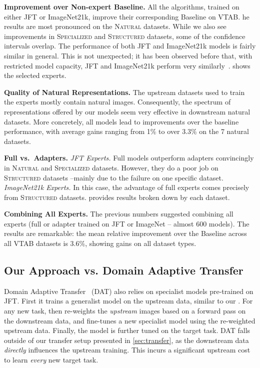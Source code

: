 \documentclass{article}
\newcommand{\JFT}{{JFT}\xspace}
\begin{document}
\textbf{Improvement over Non-expert Baseline.}
All the algorithms, trained on either \JFT or ImageNet21k, improve their corresponding Baseline on VTAB.
he results are most pronounced on the \textsc{Natural} datasets.
While we also see improvements in \textsc{Specialized} and \textsc{Structured} datasets, some of the confidence intervals overlap.
The performance of both \JFT and ImageNet21k models is fairly similar in general.
This is not unexpected; it has been observed before that, with restricted model capacity, \JFT and ImageNet21k perform very similarly~\cite{kolesnikov2019large}.
 shows the selected experts.

\textbf{Quality of Natural Representations.}
The upstream datasets used to train the experts mostly contain natural images.
Consequently, the spectrum of representations offered by our models seem very effective in downstream natural datasets.
More concretely, all models lead to improvements over the baseline performance, with average gains ranging from 1\% to over 3.3\% on the 7 natural datasets.

\textbf{Full vs.\ Adapters.}
\emph{JFT Experts.}
Full models outperform adapters convincingly in \textsc{Natural} and \textsc{Specialized} datasets.
However, they do a poor job on \textsc{Structured} datasets --mainly due to the failure on one specific dataset.
 \emph{ImageNet21k Experts.}
In this case, the advantage of full experts comes precisely from \textsc{Structured} datasets.
 provides results broken down by each dataset.

\textbf{Combining All Experts.} The previous numbers suggested combining all experts (full or adapter trained on JFT or ImageNet -- almost 600 models). The results are remarkable: the mean relative improvement over the Baseline across all 
VTAB datasets is 3.6\%, showing gains on all dataset types.
    






    
    



\subsection{Our Approach vs. Domain Adaptive Transfer}
\label{subsec:adaptive_transfer_comparison}

Domain Adaptive Transfer~\cite{ngiam2018domain} (DAT) also relies on specialist models pre-trained on JFT.
First it trains a generalist model on the upstream data, 
similar to our .
For any new task, then re-weights the \emph{upstream} images based on 
a forward pass on the downstream data, and fine-tunes a new specialist
model using the re-weighted upstream data. Finally, 
the model is further tuned on the target task.
DAT falls outside of our transfer setup presented in 
\cref{sec:transfer},
as the downstream data \emph{directly} influences the upstream training.
This incurs a significant upstream cost to learn \emph{every} new
target task.
\end{document}
